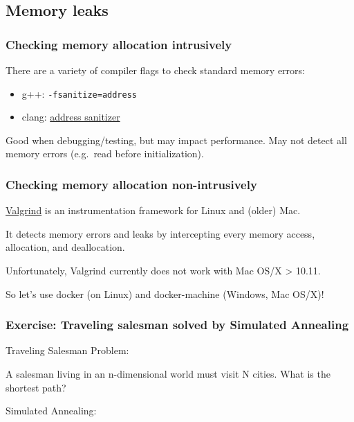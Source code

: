 \subsection{Memory leaks}\label{memory-leaks}

\subsubsection{Checking memory allocation
intrusively}\label{checking-memory-allocation-intrusively}

There are a variety of compiler flags to check standard memory errors:

\begin{itemize}
\itemsep1pt\parskip0pt
\item
  g++: \texttt{-fsanitize=address}
\item
  clang:
  \href{https://clang.llvm.org/docs/AddressSanitizer.html}{address
  sanitizer}
\end{itemize}

Good when debugging/testing, but may impact performance. May not detect
all memory errors (e.g.~read before initialization).

\subsubsection{Checking memory allocation
non-intrusively}\label{checking-memory-allocation-non-intrusively}

\href{http://valgrind.org/}{Valgrind} is an instrumentation framework
for Linux and (older) Mac.

It detects memory errors and leaks by intercepting every memory access,
allocation, and deallocation.

Unfortunately, Valgrind currently does not work with Mac OS/X
\textgreater{} 10.11.

So let's use docker (on Linux) and docker-machine (Windows, Mac OS/X)!

\subsubsection{Exercise: Traveling salesman solved by Simulated
Annealing}\label{exercise-traveling-salesman-solved-by-simulated-annealing}

Traveling Salesman Problem:

A salesman living in an n-dimensional world must visit N cities. What is
the shortest path?

Simulated Annealing:

